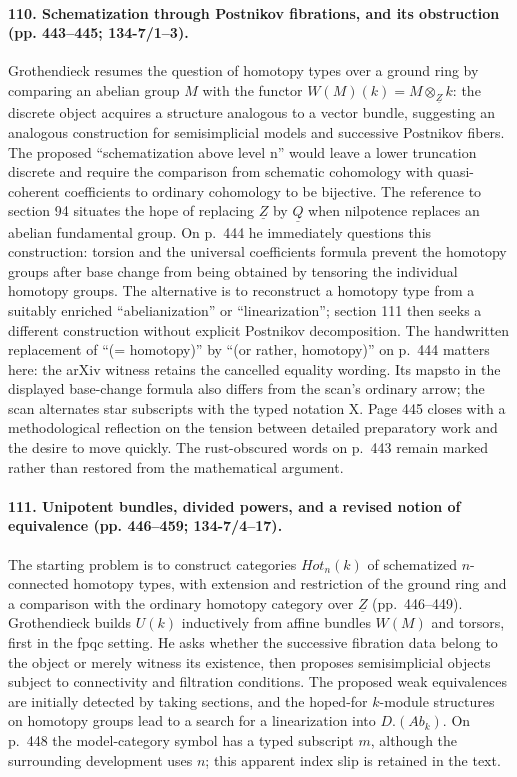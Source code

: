 \paragraph{110. Schematization through Postnikov fibrations, and its obstruction (pp. 443--445; 134-7/1--3).}
Grothendieck resumes the question of homotopy types over a ground ring by comparing an abelian group $M$ with the functor $W(M)(k)=M\otimes_{\underline Z}k$: the discrete object acquires a structure analogous to a vector bundle, suggesting an analogous construction for semisimplicial models and successive Postnikov fibers. The proposed ``schematization above level n'' would leave a lower truncation discrete and require the comparison from schematic cohomology with quasi-coherent coefficients to ordinary cohomology to be bijective. The reference to section 94 situates the hope of replacing $\underline Z$ by $\underline Q$ when nilpotence replaces an abelian fundamental group. On p.~444 he immediately questions this construction: torsion and the universal coefficients formula prevent the homotopy groups after base change from being obtained by tensoring the individual homotopy groups. The alternative is to reconstruct a homotopy type from a suitably enriched ``abelianization'' or ``linearization''; section 111 then seeks a different construction without explicit Postnikov decomposition. The handwritten replacement of ``(= homotopy)'' by ``(or rather, homotopy)'' on p.~444 matters here: the arXiv witness retains the cancelled equality wording. Its mapsto in the displayed base-change formula also differs from the scan's ordinary arrow; the scan alternates star subscripts with the typed notation X. Page 445 closes with a methodological reflection on the tension between detailed preparatory work and the desire to move quickly. The rust-obscured words on p.~443 remain marked rather than restored from the mathematical argument.

\paragraph{111. Unipotent bundles, divided powers, and a revised notion of equivalence (pp. 446--459; 134-7/4--17).}
The starting problem is to construct categories $Hot_n(k)$ of schematized $n$-connected homotopy types, with extension and restriction of the ground ring and a comparison with the ordinary homotopy category over $\underline Z$ (pp.~446--449). Grothendieck builds $U(k)$ inductively from affine bundles $W(M)$ and torsors, first in the fpqc setting. He asks whether the successive fibration data belong to the object or merely witness its existence, then proposes semisimplicial objects subject to connectivity and filtration conditions. The proposed weak equivalences are initially detected by taking sections, and the hoped-for $k$-module structures on homotopy groups lead to a search for a linearization into $D.(Ab_k)$. On p.~448 the model-category symbol has a typed subscript $m$, although the surrounding development uses $n$; this apparent index slip is retained in the text.

